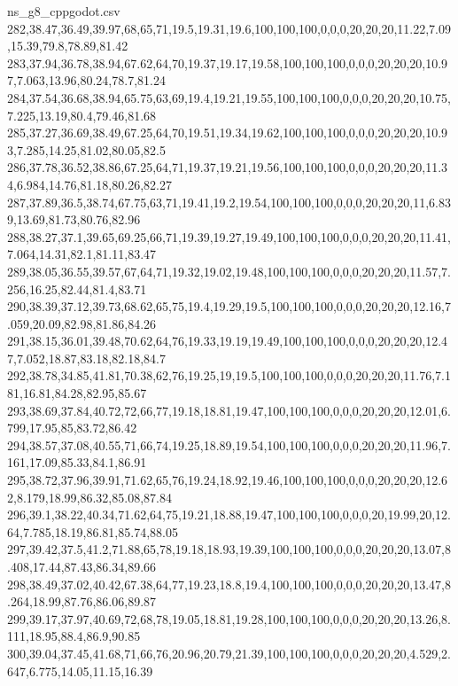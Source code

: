 \begin{filecontents*}[overwrite]{ns_g8_cppgodot.csv}
282,38.47,36.49,39.97,68,65,71,19.5,19.31,19.6,100,100,100,0,0,0,20,20,20,11.22,7.09,15.39,79.8,78.89,81.42
283,37.94,36.78,38.94,67.62,64,70,19.37,19.17,19.58,100,100,100,0,0,0,20,20,20,10.97,7.063,13.96,80.24,78.7,81.24
284,37.54,36.68,38.94,65.75,63,69,19.4,19.21,19.55,100,100,100,0,0,0,20,20,20,10.75,7.225,13.19,80.4,79.46,81.68
285,37.27,36.69,38.49,67.25,64,70,19.51,19.34,19.62,100,100,100,0,0,0,20,20,20,10.93,7.285,14.25,81.02,80.05,82.5
286,37.78,36.52,38.86,67.25,64,71,19.37,19.21,19.56,100,100,100,0,0,0,20,20,20,11.34,6.984,14.76,81.18,80.26,82.27
287,37.89,36.5,38.74,67.75,63,71,19.41,19.2,19.54,100,100,100,0,0,0,20,20,20,11,6.839,13.69,81.73,80.76,82.96
288,38.27,37.1,39.65,69.25,66,71,19.39,19.27,19.49,100,100,100,0,0,0,20,20,20,11.41,7.064,14.31,82.1,81.11,83.47
289,38.05,36.55,39.57,67,64,71,19.32,19.02,19.48,100,100,100,0,0,0,20,20,20,11.57,7.256,16.25,82.44,81.4,83.71
290,38.39,37.12,39.73,68.62,65,75,19.4,19.29,19.5,100,100,100,0,0,0,20,20,20,12.16,7.059,20.09,82.98,81.86,84.26
291,38.15,36.01,39.48,70.62,64,76,19.33,19.19,19.49,100,100,100,0,0,0,20,20,20,12.47,7.052,18.87,83.18,82.18,84.7
292,38.78,34.85,41.81,70.38,62,76,19.25,19,19.5,100,100,100,0,0,0,20,20,20,11.76,7.181,16.81,84.28,82.95,85.67
293,38.69,37.84,40.72,72,66,77,19.18,18.81,19.47,100,100,100,0,0,0,20,20,20,12.01,6.799,17.95,85,83.72,86.42
294,38.57,37.08,40.55,71,66,74,19.25,18.89,19.54,100,100,100,0,0,0,20,20,20,11.96,7.161,17.09,85.33,84.1,86.91
295,38.72,37.96,39.91,71.62,65,76,19.24,18.92,19.46,100,100,100,0,0,0,20,20,20,12.62,8.179,18.99,86.32,85.08,87.84
296,39.1,38.22,40.34,71.62,64,75,19.21,18.88,19.47,100,100,100,0,0,0,20,19.99,20,12.64,7.785,18.19,86.81,85.74,88.05
297,39.42,37.5,41.2,71.88,65,78,19.18,18.93,19.39,100,100,100,0,0,0,20,20,20,13.07,8.408,17.44,87.43,86.34,89.66
298,38.49,37.02,40.42,67.38,64,77,19.23,18.8,19.4,100,100,100,0,0,0,20,20,20,13.47,8.264,18.99,87.76,86.06,89.87
299,39.17,37.97,40.69,72,68,78,19.05,18.81,19.28,100,100,100,0,0,0,20,20,20,13.26,8.111,18.95,88.4,86.9,90.85
300,39.04,37.45,41.68,71,66,76,20.96,20.79,21.39,100,100,100,0,0,0,20,20,20,4.529,2.647,6.775,14.05,11.15,16.39
\end{filecontents*}


